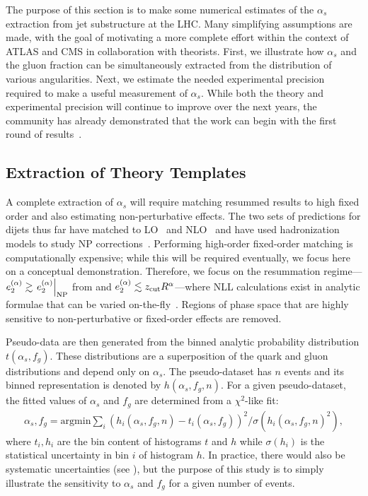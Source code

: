 
The purpose of this section is to make some numerical estimates of the $\alpha_s$ extraction from jet substructure at the LHC.
%
Many simplifying assumptions are made, with the goal of motivating a more complete effort within the context of ATLAS and CMS in collaboration with theorists.
%
First, we illustrate how $\alpha_s$ and the gluon fraction can be simultaneously extracted from the distribution of various angularities.
%
Next, we estimate the needed experimental precision required to make a useful measurement of $\alpha_s$.
%
While both the theory and experimental precision will continue to improve over the next years, the community has already demonstrated that the work can begin with the first round of results~\cite{Aaboud:2017qwh,CMS-PAS-SMP-16-010,Frye:2016aiz,Frye:2016okc,Marzani:2017mva,Marzani:2017kqd}.

\subsection{Extraction of Theory Templates}
\label{sec:templates}

A complete extraction of $\alpha_s$ will require matching resummed results to high fixed order and also estimating non-perturbative effects.
%
The two sets of predictions for dijets thus far have matched to LO~\cite{Frye:2016aiz,Frye:2016okc} and NLO~\cite{Marzani:2017mva,Marzani:2017kqd} and have used hadronization models to study NP corrections~\cite{Marzani:2017mva,Marzani:2017kqd}.
%
Performing high-order fixed-order matching is computationally expensive; while this will be required eventually, we focus here on a conceptual demonstration.
%
Therefore, we focus on the resummation regime---$e_{2}^{(\alpha)}\gtrsim \left. e_{2}^{(\alpha)} \right |_{\text{NP}}$ from  and $e_{2}^{(\alpha)}\lesssim z_\text{cut}R^\alpha$---where NLL calculations exist in analytic formulae that can be varied on-the-fly~\cite{Marzani:2017mva,Marzani:2017kqd}.
%
Regions of phase space that are highly sensitive to non-perturbative or fixed-order effects are removed.

Pseudo-data are then generated from the binned analytic probability distribution $t(\alpha_s,f_g)$.
%
These distributions are a superposition of the quark and gluon distributions and depend only on $\alpha_s$.
%
The pseudo-dataset has $n$ events and its binned representation is denoted by $h(\alpha_s,f_g,n)$.
%
For a given pseudo-dataset, the fitted values of $\alpha_s$ and $f_g$ are determined from a $\chi^2$-like fit:
%
\begin{align}
\label{eq:chi2fit}
\alpha_s,f_g=\text{argmin} \sum_i (h_i(\alpha_s,f_g,n)-t_i(\alpha_s,f_g))^2/\sigma(h_i(\alpha_s,f_g,n)^2),
\end{align}
%
where $t_i, h_i$ are the bin content of histograms $t$ and $h$ while $\sigma(h_i)$ is the statistical uncertainty in bin $i$ of histogram $h$.
%
In practice, there would also be systematic uncertainties (see ), but the purpose of this study is to simply illustrate the sensitivity to $\alpha_s$ and $f_g$ for a given number of events.

